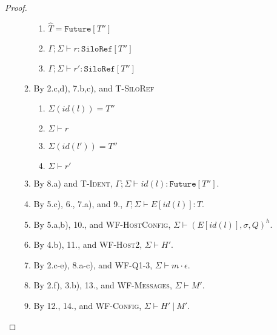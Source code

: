 \begin{proof}
\begin{itemize}
\begin{enumerate}
\begin{enumerate}[label=(\alph*)]
  \item $\hat{T} = \texttt{Future}[T'']$
  \item $\Gamma ; \Sigma \vdash r : \texttt{SiloRef}[T'']$
  \item $\Gamma ; \Sigma \vdash r' : \texttt{SiloRef}[T'']$
  \end{enumerate}
\item By 2.c,d), 7.b,c), and \textsc{T-SiloRef}
  \begin{enumerate}[label=(\alph*)]
  \item $\Sigma(id(l)) = T''$
  \item $\Sigma \vdash r$
  \item $\Sigma(id(l')) = T''$
  \item $\Sigma \vdash r'$
  \end{enumerate}
\item By 8.a) and \textsc{T-Ident}, $\Gamma ; \Sigma \vdash id(l) : \texttt{Future}[T'']$.
\item By 5.c), 6., 7.a), and 9., $\Gamma ; \Sigma \vdash E[id(l)] : T$.
\item By 5.a,b), 10., and \textsc{WF-HostConfig}, $\Sigma \vdash (E[id(l)], \sigma, Q)^h$.
\item By 4.b), 11., and \textsc{WF-Host2}, $\Sigma \vdash H'$.
\item By 2.c-e), 8.a-c), and \textsc{WF-Q1-3}, $\Sigma \vdash m \cdot \epsilon$.
\item By 2.f), 3.b), 13., and \textsc{WF-Messages}, $\Sigma \vdash M'$.
\item By 12., 14., and \textsc{WF-Config}, $\Sigma \vdash H'~|~M'$.
\end{enumerate}


\end{itemize}
\end{proof}
